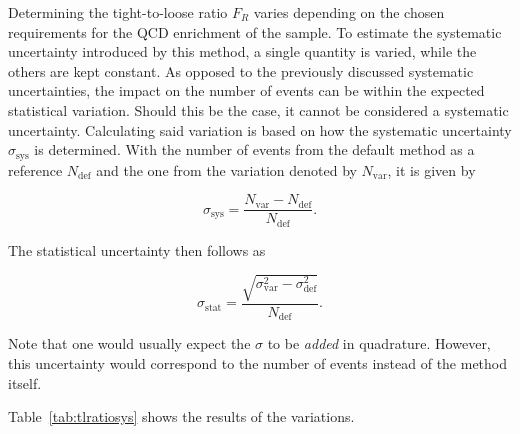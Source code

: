 Determining the tight-to-loose ratio $F_R$ varies depending on the chosen requirements for the QCD enrichment of the sample. To estimate the systematic uncertainty introduced by this method, a single quantity is varied, while the others are kept constant. As opposed to the previously discussed systematic uncertainties, the impact on the number of events can be within the expected statistical variation. Should this be the case, it cannot be considered a systematic uncertainty. Calculating said variation is based on how the systematic uncertainty $\sigma_{\text{sys}}$ is determined. With the number of events from the default method as a reference $N_{\text{def}}$ and the one from the variation denoted by $N_{\text{var}}$, it is given by

\begin{equation}
  \label{eq:frsysabs}
  \sigma_{\text{sys}} = \frac{N_{\text{var}} - N_{\text{def}}}{N_{\text{def}}}.
\end{equation}

\noindent The statistical uncertainty then follows as

\begin{equation}
  \label{eq:frstatabs}
  \sigma_{\text{stat}} = \frac{\sqrt{\sigma_{\text{var}}^2 - \sigma_{\text{def}}^2}}{N_{\text{def}}}.
\end{equation}

\noindent Note that one would usually expect the $\sigma$ to be \textit{added} in quadrature. However, this uncertainty would correspond to the number of events instead of the method itself.

Table~\ref{tab:tlratiosys} shows the results of the variations.

